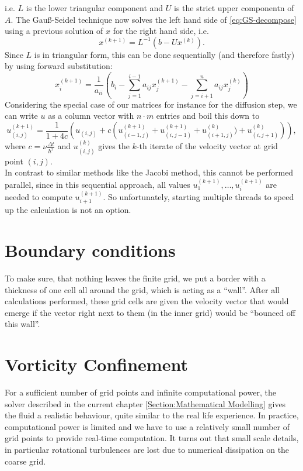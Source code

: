 \documentclass[a4paper,10pt,oneside,final,german,openbib,pdftex,titlepage]{scrbook}
\begin{document}
i.e. $L$ is the lower triangular component and $U$ is the strict upper componentn of $A$. 
The Gauß-Seidel technique now solves the left hand side of \ref{eq:GS-decompose} using a previous solution of $x$ for the right hand side, i.e.
\begin{equation}
x^{(k+1)}=L^{-1}(b-Ux^{(k)}).
\end{equation}
Since $L$ is in triangular form, this can be done sequentially (and therefore fastly) by using forward substitution:
\begin{equation}
x^{(k+1)}_i=\frac{1}{a_{ii}}\left( b_i - \sum_{j=1}^{i-1} a_{ij}x_j^{(k+1)} - \sum_{j=i+1}^{n} a_{ij}x_j^{(k)} \right)
\end{equation} Considering the special case of our matrices for instance for the diffusion step, we can write $u$ as a column vector with $n\cdot m$ entries and boil this down to
\begin{equation}
u^{(k+1)}_{(i,j)} = \frac{1}{1+4c} \left( u_{(i,j)} + c\left(u^{(k+1)}_{(i-1,j)} + u^{(k+1)}_{(i,j-1)} + u^{(k)}_{(i+1,j)}) + u^{(k)}_{(i,j+1)}\right) \right),
\end{equation}
where $c= \nu\frac{\Delta t}{h^2}$ and $u^{(k)}_{(i,j)}$ gives the $k$-th iterate of the velocity vector at grid point $(i,j)$.\\

In contrast to similar methods like the Jacobi method, this cannot be performed parallel, since in this sequential approach, all values $u_1^{(k+1)}, \dots, u_i^{(k+1)}$ are needed to compute $u_{i+1}^{(k+1)}$. So unfortunately, starting multiple threads to speed up the calculation is not an option.

\section{Boundary conditions}
To make sure, that nothing leaves the finite grid, we put a border with a thickness of one cell all around the grid, which is acting as a ``wall''. After all calculations performed, these grid cells are given the velocity vector that would emerge if the vector right next to them (in the inner grid) would be ``bounced off this wall''.\\

\section{Vorticity Confinement}
For a sufficient number of grid points and infinite computational power, the solver described in the current chapter \ref{Section:Mathematical Modelling} gives the fluid a realistic behaviour, quite similar to the real life experience. In practice, computational power is limited and we have to use a relatively small number of grid points to provide real-time computation. It turns out that small scale details, in particular rotational turbulences are lost due to numerical dissipation on the coarse grid.\\
\end{document}
